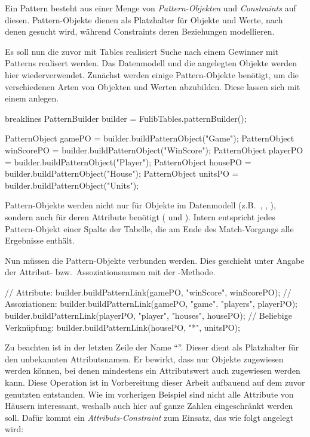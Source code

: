 Ein Pattern besteht aus einer Menge von \emph{Pattern-Objekten} und \emph{Constraints} auf diesen.
Pattern-Objekte dienen als Platzhalter für Objekte und Werte, nach denen gesucht wird,
während Constraints deren Beziehungen modellieren.

Es soll nun die zuvor mit Tables realisiert Suche nach einem Gewinner mit Patterns realisert werden.
Das Datenmodell und die angelegten Objekte werden hier wiederverwendet.
Zunächst werden einige Pattern-Objekte benötigt, um die verschiedenen Arten von Objekten und Werten abzubilden.
Diese lassen sich mit einem  anlegen.

\begin{jcodeblock*}{breaklines}
    PatternBuilder builder = FulibTables.patternBuilder();

    PatternObject gamePO = builder.buildPatternObject("Game");
    PatternObject winScorePO = builder.buildPatternObject("WinScore");
    PatternObject playerPO = builder.buildPatternObject("Player");
    PatternObject housePO = builder.buildPatternObject("House");
    PatternObject unitsPO = builder.buildPatternObject("Units");
\end{jcodeblock*}

Pattern-Objekte werden nicht nur für Objekte im Datenmodell (z.B.\ , , ),
sondern auch für deren Attribute benötigt ( und ).
Intern entspricht jedes Pattern-Objekt einer Spalte der Tabelle, die am Ende des Match-Vorgangs alle Ergebnisse enthält.

Nun müssen die Pattern-Objekte verbunden werden.
Dies geschieht unter Angabe der Attribut- bzw.\ Assoziationsnamen mit der -Methode.

\begin{jcodeblock}
    // Attribute:
    builder.buildPatternLink(gamePO, "winScore", winScorePO);
    // Assoziationen:
    builder.buildPatternLink(gamePO, "game", "players", playerPO);
    builder.buildPatternLink(playerPO, "player", "houses", housePO);
    // Beliebige Verknüpfung:
    builder.buildPatternLink(housePO, "*", unitsPO);
\end{jcodeblock}

Zu beachten ist in der letzten Zeile der Name ``\code{*}''.
Dieser dient als Platzhalter für den unbekannten Attributsnamen.
Er bewirkt, dass nur Objekte  zugewiesen werden können, bei denen mindestens ein Attributswert auch  zugewiesen werden kann.
Diese Operation ist in Vorbereitung dieser Arbeit aufbauend auf dem zuvor genutzten  entstanden.
Wie im vorherigen Beispiel sind nicht alle Attribute von Häusern interessant,
weshalb auch hier auf ganze Zahlen eingeschränkt werden soll.
Dafür kommt ein \emph{Attributs-Constraint} zum Einsatz, das wie folgt angelegt wird:

